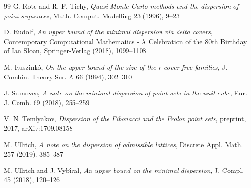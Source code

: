 \documentclass[11pt]{article}
\begin{document}
\begin{thebibliography}{99}
 G. Rote and R. F. Tichy, \emph{Quasi-Monte Carlo methods and the dispersion of point sequences}, Math. Comput. Modelling 23 (1996), 9--23

 D. Rudolf, \emph{An upper bound of the minimal dispersion via delta covers}, Contemporary Computational Mathematics - A Celebration of the 80th Birthday
of Ian Sloan, Springer-Verlag (2018), 1099--1108

 M. Ruszink\'o, \emph{On the upper bound of the size of the $r$-cover-free families}, J. Combin. Theory Ser. A 66 (1994), 302--310

 J. Sosnovec, \emph{A note on the minimal dispersion of point sets in the unit cube}, Eur. J. Comb. 69 (2018), 255--259

 V. N. Temlyakov, \emph{Dispersion of the Fibonacci and the Frolov point sets}, preprint, 2017, arXiv:1709.08158

 M. Ullrich, \emph{A note on the dispersion of admissible lattices}, Discrete Appl. Math. 257 (2019), 385–387

 M. Ullrich and J. Vyb\'\i ral, \emph{An upper bound on the minimal dispersion}, J. Compl. 45 (2018), 120--126

\end{thebibliography}
\end{document}

